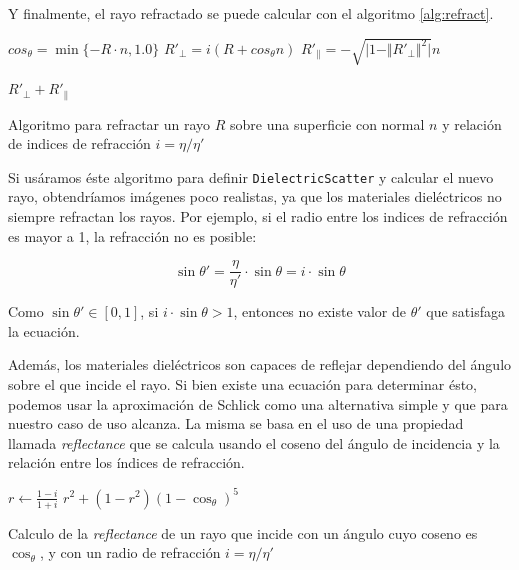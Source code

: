 Y finalmente, el rayo refractado se puede calcular con el algoritmo
\ref{alg:refract}.

\begin{algorithm}[H]
\begin{algorithmic}[1]

    \State $cos_{\theta} = \min\{-R \cdot n, 1.0\}$
    \State $R'_{\perp} = i (R + cos_{\theta} n)$
    \State $R'_{\parallel} = - \sqrt{\vert 1 - \Vert R'_{\perp} \Vert ^ 2 \vert} n$

    \State \Return $R'_{\perp} + R'_{\parallel}$
\EndFunction
\end{algorithmic}
\caption{Algoritmo para refractar un rayo $R$ sobre una superficie con normal
$n$ y relación de indices de refracción $i = \eta / \eta'$}
\label{alg:refract}
\end{algorithm}

Si usáramos éste algoritmo para definir \texttt{DielectricScatter} y calcular el
nuevo rayo, obtendríamos imágenes poco realistas, ya que los materiales
dieléctricos no siempre refractan los rayos. Por ejemplo, si el radio entre los
indices de refracción es mayor a 1, la refracción no es posible:

\[
    \sin \theta' = \frac{\eta}{\eta'} \cdot \sin \theta = i \cdot \sin \theta
\]

Como $\sin \theta' \in [0, 1]$, si $i \cdot \sin \theta > 1$, entonces no existe valor
de $\theta'$ que satisfaga la ecuación.

Además, los materiales dieléctricos son capaces de reflejar dependiendo del
ángulo sobre el que incide el rayo. Si bien existe una ecuación para determinar
ésto, podemos usar la aproximación de Schlick \cite{schlicksapprox} como una
alternativa simple y que para nuestro caso de uso alcanza. La misma se basa en
el uso de una propiedad llamada \textit{reflectance} que se calcula usando el
coseno del ángulo de incidencia y la relación entre los índices de refracción.

\begin{algorithm}[H]
\begin{algorithmic}[1]
    \State $r \gets \frac{1 - i}{1 + i}$
    \State \Return $r^2 + (1-r^2) (1 - \cos_{\theta})^5$
\EndFunction
\end{algorithmic}
\caption{Calculo de la \textit{reflectance} de un rayo que incide con un ángulo
cuyo coseno es $\cos_{\theta}$, y con un radio de refracción $i = \eta / \eta'$}
\label{alg:reflectance}
\end{algorithm}

